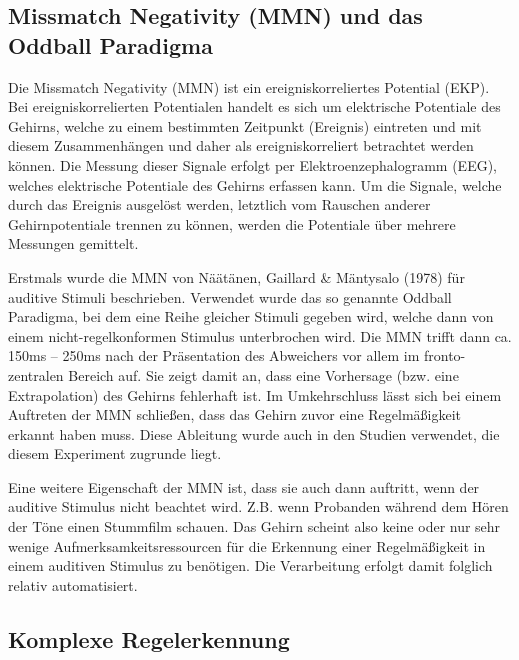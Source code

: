 \documentclass[doc,a4paper,12pt]{apa6}
\begin{document}
\subsection{Missmatch Negativity (MMN) und das Oddball Paradigma}

Die Missmatch Negativity (MMN) ist ein ereigniskorreliertes Potential (EKP). Bei ereigniskorrelierten Potentialen handelt es sich um elektrische Potentiale des Gehirns, welche zu einem bestimmten Zeitpunkt (Ereignis) eintreten und mit diesem Zusammenhängen und daher als ereigniskorreliert betrachtet werden können. Die Messung dieser Signale erfolgt per Elektroenzephalogramm (EEG), welches elektrische Potentiale des Gehirns erfassen kann. Um die Signale, welche durch das Ereignis ausgelöst werden, letztlich vom Rauschen anderer Gehirnpotentiale trennen zu können, werden die Potentiale über mehrere Messungen gemittelt.

Erstmals wurde die MMN von Näätänen, Gaillard \& Mäntysalo (1978) für auditive Stimuli beschrieben. Verwendet wurde das so genannte Oddball Paradigma, bei dem eine Reihe gleicher Stimuli gegeben wird, welche dann von einem nicht-regelkonformen Stimulus unterbrochen wird. Die MMN trifft dann ca. 150ms – 250ms nach der Präsentation des Abweichers vor allem im fronto-zentralen Bereich auf. Sie zeigt damit an, dass eine Vorhersage (bzw. eine Extrapolation) des Gehirns fehlerhaft ist. Im Umkehrschluss lässt sich bei einem Auftreten der MMN schließen, dass das Gehirn zuvor eine Regelmäßigkeit erkannt haben muss. Diese Ableitung wurde auch in den Studien verwendet, die diesem Experiment zugrunde liegt.

Eine weitere Eigenschaft der MMN ist, dass sie auch dann auftritt, wenn der auditive Stimulus nicht beachtet wird. Z.B. wenn Probanden während dem Hören der Töne einen Stummfilm schauen. Das Gehirn scheint also keine oder nur sehr wenige Aufmerksamkeitsressourcen für die Erkennung einer Regelmäßigkeit in einem auditiven Stimulus zu benötigen. Die Verarbeitung erfolgt damit folglich relativ automatisiert.

\subsection{Komplexe Regelerkennung}
\end{document}
